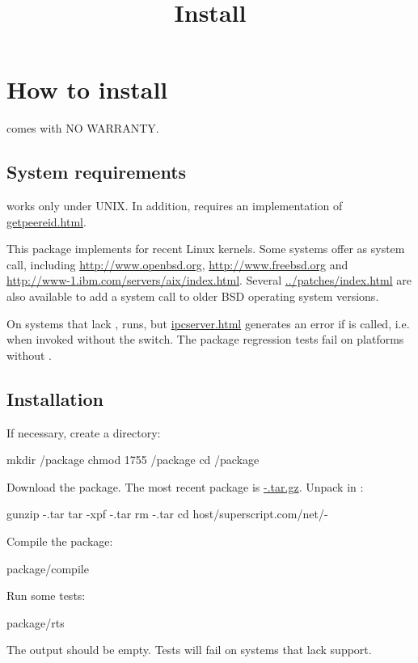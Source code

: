 \documentclass{book}
\title{Install}
\begin{document}
\section{How to install \package}

\package{} comes with NO WARRANTY.

\subsection{System requirements}
\package{} works only under UNIX.  In addition, \package{} requires
an implementation of \href{\cmd{getpeereid}}{getpeereid.html}.

This package implements  for recent Linux kernels.
Some systems offer  as system call, including
\href{OpenBSD~3.0}{http://www.openbsd.org},
\href{FreeBSD~4.6}{http://www.freebsd.org} and
\href{AIX~5L}{http://www-1.ibm.com/servers/aix/index.html}.
Several \href{patches}{../patches/index.html} are also available to add
a  system call to older BSD operating system versions.

On systems that lack , \package{} runs, but
\href{\cmd{ipcserver}}{ipcserver.html} generates an error if 
is called, i.e. when invoked without the  switch.  The package
regression tests fail on platforms without .

\subsection{Installation}
If necessary, create a  directory:
\begin{code}%
  mkdir /package
  chmod 1755 /package
  cd /package
\end{code}

Download the \package{} package.  The most recent \package{} package is
\href{\version}{\package-\version.tar.gz}.  Unpack \package{} in
:
\begin{code}%
  gunzip \package-\version.tar
  tar -xpf \package-\version.tar
  rm \package-\version.tar
  cd host/superscript.com/net/\package-\version
\end{code}

Compile the package:
\begin{code}%
  package/compile
\end{code}

Run some tests:
\begin{code}%
  package/rts
\end{code}
The output should be empty.  Tests will fail on systems that lack
 support.
\end{document}
